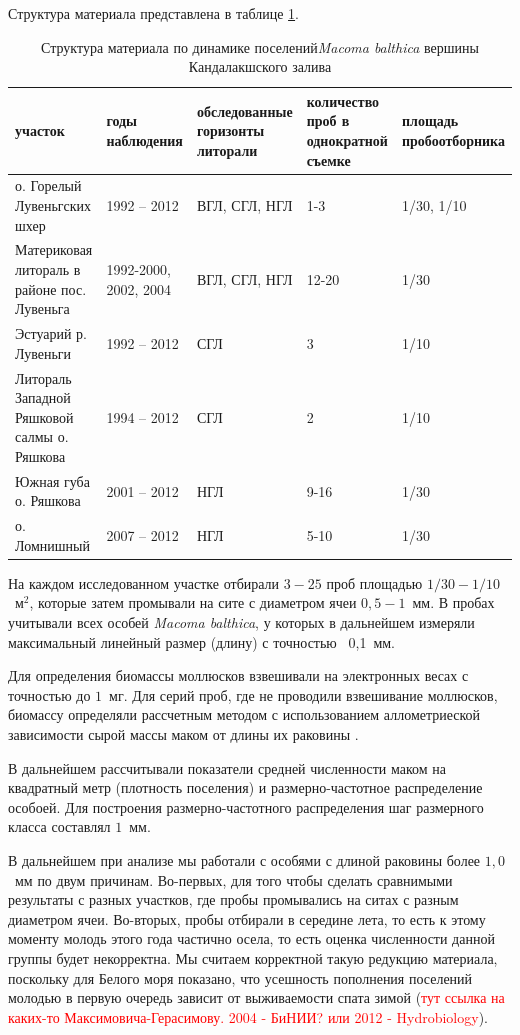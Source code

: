 Структура материала представлена в таблице \ref{tab:material_Kandalaksha}.
\begin{table}
    \begin{tabularx}{\textwidth}{|*{5}{X|}} \hline
участок & годы наблюдения & обследованные горизонты литорали & количество проб в однократной съемке & площадь пробоотборника  \\ \hline
о. Горелый Лувеньгских шхер & 1992 -- 2012 & ВГЛ, СГЛ, НГЛ & 1-3 & 1/30, 1/10 \\ \hline
Материковая литораль в районе пос. Лувеньга & 1992-2000, 2002, 2004 & ВГЛ, СГЛ, НГЛ & 12-20 & 1/30 \\ \hline
Эстуарий р. Лувеньги & 1992 -- 2012 & СГЛ & 3 & 1/10 \\ \hline
Литораль Западной Ряшковой салмы о. Ряшкова & 1994 -- 2012 & СГЛ & 2 & 1/10 \\ \hline
Южная губа о. Ряшкова & 2001 -- 2012 & НГЛ & 9-16 & 1/30 \\ \hline
о. Ломнишный & 2007 -- 2012 & НГЛ & 5-10 & 1/30  \\ \hline
\end{tabularx}
\caption{Структура материала по динамике поселений{\it Macoma balthica} вершины Кандалакшского залива}
\label{tab:material_Kandalaksha}
\end{table}

На каждом исследованном участке отбирали $3 - 25$ проб площадью $1/30 - 1/10$~м$^2$, которые затем промывали на сите с диаметром ячеи $0,5 - 1$~мм. 
В пробах учитывали всех особей {\it Macoma balthica}, у которых в дальнейшем измеряли максимальный линейный размер (длину) с точностью ~0,1~мм. 

Для определения биомассы моллюсков взвешивали на электронных весах с точностью до $1$~мг. 
Для серий проб, где не проводили взвешивание моллюсков, биомассу определяли рассчетным методом с использованием аллометриеской зависимости сырой массы маком от длины их раковины \cite{Maximovich_et_al_1993}.

В дальнейшем рассчитывали показатели средней численности маком на квадратный метр (плотность поселения) и размерно-частотное распределение особоей.
Для построения размерно-частотного распределения шаг размерного класса составлял $1$~мм.

В дальнейшем при анализе мы работали с особями с длиной раковины более $1,0$~мм по двум причинам. 
Во-первых, для того чтобы сделать сравнимыми результаты с разных участков, где пробы промывались на ситах с разным диаметром ячеи. 
Во-вторых, пробы отбирали в середине лета, то есть к этому моменту молодь этого года частично осела, то есть оценка численности данной группы будет некорректна.
Мы считаем корректной такую редукцию материала, поскольку для Белого моря показано, что усешность пополнения поселений молодью в первую очередь зависит от выживаемости спата зимой (\textcolor{red}{тут ссылка на каких-то Максимовича-Герасимову. 2004 - БиНИИ? или 2012 - Hydrobiology}).

